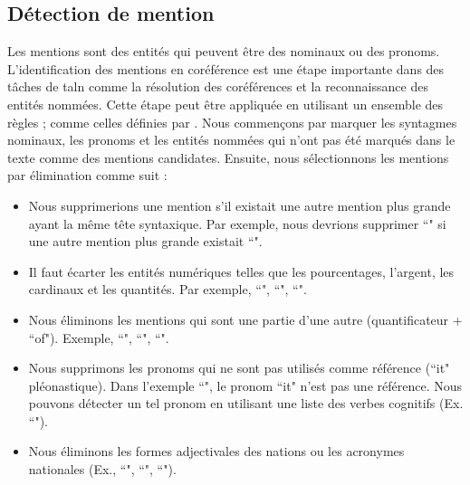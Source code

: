 \documentclass{KodeBook}
\begin{document}
\subsection{Détection de mention}

Les mentions sont des entités qui peuvent être des  nominaux ou des pronoms.
L'identification des mentions en coréférence est une étape importante dans des tâches de \ac{taln} comme la résolution des coréférences et la reconnaissance des entités nommées.
Cette étape peut être appliquée en utilisant un ensemble des règles ; comme celles définies par \citet{2013-lee-al}.
Nous commençons par marquer les syntagmes nominaux, les pronoms et les entités nommées qui n'ont pas été marqués dans le texte comme des mentions candidates. 
Ensuite, nous sélectionnons les mentions par élimination comme suit :
\begin{itemize}
	\item Nous supprimerions une mention s'il existait une autre mention plus grande ayant la même tête syntaxique. 
	Par exemple, nous devrions supprimer ``" si une autre mention plus grande existait ``". 
	
	\item Il faut écarter les entités numériques telles que les pourcentages, l'argent, les cardinaux et les quantités. 
	Par exemple, ``", ``", ``".
	
	\item Nous éliminons les mentions qui sont une partie d'une autre (quantificateur + ``of"). 
	Exemple, ``", ``", ``".
	
	\item Nous supprimons les pronoms qui ne sont pas utilisés comme référence (``it" pléonastique). 
	Dans l'exemple ``", le pronom ``it" n'est pas une référence. 
	Nous pouvons détecter un tel pronom en utilisant une liste des verbes cognitifs (Ex. ``").
	
	\item Nous éliminons les formes adjectivales des nations ou les acronymes nationales (Ex.,
	``", ``", ``").
\end{itemize}
\end{document}
